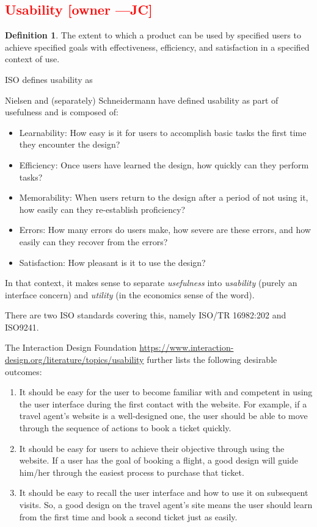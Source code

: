 \documentclass[letterpaper,cleveref]{lipics-v2019}
\newcommand{\authornote}[3]{\textcolor{#1}{[#3 ---#2]}}
\newcommand{\authornote}[3]{}
\newcommand{\jc}[1]{\authornote{red}{JC}{#1}} %
\newcommand{\notdone}[1]{\textcolor{red}{#1}}
\theoremstyle{definition}
\newtheorem{defn}{Definition}
\begin{document}
\subsection{\notdone{Usability} \jc{owner}} 

\begin{defn}
  The extent to which a product can be used by specified users to achieve
  specified goals with effectiveness, efficiency, and satisfaction in a
  specified context of use.
\end{defn}
ISO defines usability as

Nielsen and (separately) Schneidermann have defined usability as part of
usefulness and
is composed of:
\begin{itemize}
\item Learnability: How easy is it for users to accomplish basic tasks the first
  time they encounter the design?
\item Efficiency: Once users have learned the design, how quickly can they
  perform tasks?
\item Memorability: When users return to the design after a period of not using
  it, how easily can they re-establish proficiency?
\item Errors: How many errors do users make, how severe are these errors, and
  how easily can they recover from the errors?
\item Satisfaction: How pleasant is it to use the design?
\end{itemize}
In that context, it makes sense to separate \emph{usefulness} into
\emph{usability} (purely an interface concern) and \emph{utility} (in the
economics sense of the word).

There are two ISO standards covering this, namely ISO/TR 16982:202 and ISO9241.

The Interaction Design Foundation \url{https://www.interaction-design.org/literature/topics/usability} further
lists the following desirable outcomes:

\begin{enumerate}
\item It should be easy for the user to become familiar with and competent in
  using the user interface during the first contact with the website. For
  example, if a travel agent’s website is a well-designed one, the user should
  be able to move through the sequence of actions to book a ticket quickly.
\item It should be easy for users to achieve their objective through using the
  website. If a user has the goal of booking a flight, a good design will guide
  him/her through the easiest process to purchase that ticket.
\item It should be easy to recall the user interface and how to use it on
  subsequent visits. So, a good design on the travel agent’s site means the user
  should learn from the first time and book a second ticket just as easily.
\end{enumerate}
\end{document}
